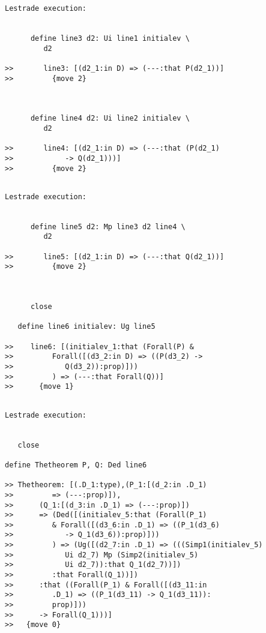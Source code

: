 \documentclass{slides}
\begin{document}
\begin{slide}

{\tiny

\begin{verbatim}Lestrade execution:


      define line3 d2: Ui line1 initialev \
         d2

>>       line3: [(d2_1:in D) => (---:that P(d2_1))]
>>         {move 2}



      define line4 d2: Ui line2 initialev \
         d2

>>       line4: [(d2_1:in D) => (---:that (P(d2_1)
>>            -> Q(d2_1)))]
>>         {move 2}


\end{verbatim}

}

\end{slide}

\begin{slide}
{\tiny
\begin{verbatim}Lestrade execution:


      define line5 d2: Mp line3 d2 line4 \
         d2

>>       line5: [(d2_1:in D) => (---:that Q(d2_1))]
>>         {move 2}



      close

   define line6 initialev: Ug line5

>>    line6: [(initialev_1:that (Forall(P) &
>>         Forall([(d3_2:in D) => ((P(d3_2) ->
>>            Q(d3_2)):prop)]))
>>         ) => (---:that Forall(Q))]
>>      {move 1}


\end{verbatim}
}

\end{slide}

\begin{slide}

\begin{verbatim}Lestrade execution:


   close

define Thetheorem P, Q: Ded line6

>> Thetheorem: [(.D_1:type),(P_1:[(d_2:in .D_1)
>>         => (---:prop)]),
>>      (Q_1:[(d_3:in .D_1) => (---:prop)])
>>      => (Ded([(initialev_5:that (Forall(P_1)
>>         & Forall([(d3_6:in .D_1) => ((P_1(d3_6)
>>            -> Q_1(d3_6)):prop)]))
>>         ) => (Ug([(d2_7:in .D_1) => (((Simp1(initialev_5)
>>            Ui d2_7) Mp (Simp2(initialev_5)
>>            Ui d2_7)):that Q_1(d2_7))])
>>         :that Forall(Q_1))])
>>      :that ((Forall(P_1) & Forall([(d3_11:in
>>         .D_1) => ((P_1(d3_11) -> Q_1(d3_11)):
>>         prop)]))
>>      -> Forall(Q_1)))]
>>   {move 0}


\end{verbatim}

\end{slide}
\end{document}
